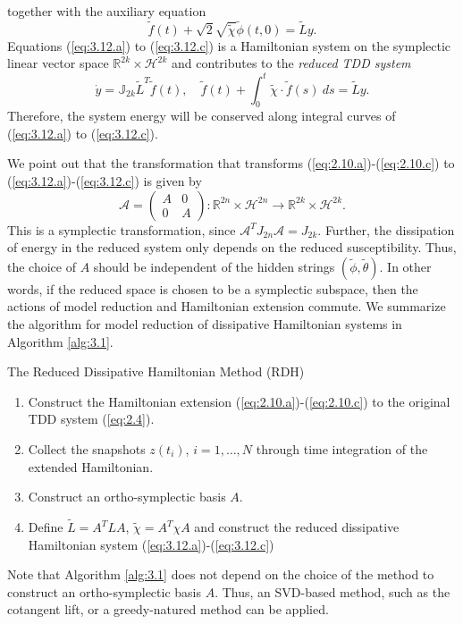 together with the auxiliary equation
\begin{equation} \label{eq:3.13}
	\tilde f(t) + \sqrt{2} \sqrt{\tilde \chi} \tilde \phi(t,0) = \tilde L y.
\end{equation}
Equations (\ref{eq:3.12.a}) to (\ref{eq:3.12.c}) is a Hamiltonian system on the symplectic linear vector space $\mathbb R^{2k} \times \mathcal H^{2k}$ and contributes to the \emph{reduced TDD system}
\begin{equation}
	\dot {y} = \mathbb J_{2k} \tilde L^T \tilde f(t), \quad \tilde f(t) + \int_0^t \tilde \chi\cdot \tilde f(s)\ ds = \tilde L y.
\end{equation}
Therefore, the system energy will be conserved along integral curves of (\ref{eq:3.12.a}) to (\ref{eq:3.12.c}).

We point out that the transformation that transforms (\ref{eq:2.10.a})-(\ref{eq:2.10.c}) to (\ref{eq:3.12.a})-(\ref{eq:3.12.c}) is given by
\begin{equation}
	\mathcal A = \begin{pmatrix}
		A& 0 \\
		0& A
	\end{pmatrix} : \mathbb R^{2n} \times \mathcal H^{2n} \to \mathbb R^{2k} \times \mathcal H^{2k}.
\end{equation}
This is a symplectic transformation, since $\mathcal A^T J_{2n} \mathcal A = J_{2k}$. Further, the dissipation of energy in the reduced system only depends on the reduced susceptibility. Thus, the choice of $A$ should be independent of the hidden strings $(\tilde \phi, \tilde \theta)$. In other words, if the reduced space is chosen to be a symplectic subspace, then the actions of model reduction and Hamiltonian extension commute. We summarize the algorithm for model reduction of dissipative Hamiltonian systems in Algorithm \ref{alg:3.1}.

\begin{algorithm}
\caption{The Reduced Dissipative Hamiltonian Method (RDH)} \label{alg:3.1}
\begin{enumerate}
	\item Construct the Hamiltonian extension (\ref{eq:2.10.a})-(\ref{eq:2.10.c}) to the original TDD system (\ref{eq:2.4}).
	\item Collect the snapshots $z(t_i)$, $i=1,\dots,N$ through time integration of the extended Hamiltonian.
	\item Construct an ortho-symplectic basis $A$.
	\item Define $\tilde L = A^T L A$, $\tilde \chi = A^T \chi A$ and construct the reduced dissipative Hamiltonian system (\ref{eq:3.12.a})-(\ref{eq:3.12.c})
\end{enumerate}
\end{algorithm}

Note that Algorithm \ref{alg:3.1} does not depend on the choice of the method to construct an ortho-symplectic basis $A$. Thus, an SVD-based method, such as the cotangent lift, or a greedy-natured method can be applied.
